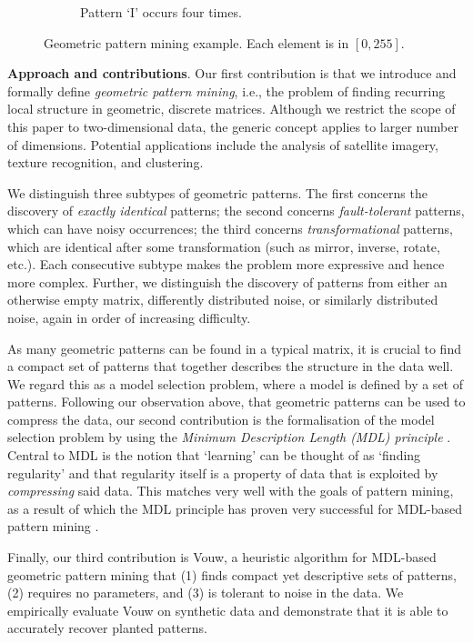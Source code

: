 \documentclass{llncs}
\begin{document}
\begin{figure}[t]
\begin{subfigure}[t]{0.37\textwidth}
\caption{Pattern `I' occurs four times.}
\label{fig-example1c}
\end{subfigure}%
\caption{Geometric pattern mining example. Each element is in $[0,255]$.}
\label{fig-example1}
\end{figure}  

\smallskip
\noindent \textbf{Approach and contributions}. Our first contribution is that we introduce and formally define \emph{geometric pattern mining}, i.e., the problem of finding recurring local structure in geometric, discrete matrices. Although we restrict the scope of this paper to two-dimensional data, the generic concept applies to larger number of dimensions. Potential applications include the analysis of satellite imagery, texture recognition, and clustering.

We distinguish three subtypes of geometric patterns. The first concerns the discovery of \emph{exactly identical} patterns; the second concerns \emph{fault-tolerant} patterns, which can have noisy occurrences; the third concerns \emph{transformational} patterns, which are identical after some transformation (such as mirror, inverse, rotate, etc.). Each consecutive subtype makes the problem more expressive and hence more complex. Further, we distinguish the discovery of patterns from either an otherwise empty matrix, differently distributed noise, or similarly distributed noise, again in order of increasing difficulty.

As many geometric patterns can be found in a typical matrix, it is crucial to find a compact set of patterns that together describes the structure in the data well. We regard this as a model selection problem, where a model is defined by a set of patterns. Following our observation above, that geometric patterns can be used to compress the data, our second contribution is the formalisation of the model selection problem by using the \emph{Minimum Description Length (MDL) principle} \cite{rissanenmdl,grunwaldmdl}. Central to MDL is the notion that `learning' can be thought of as `finding regularity' and that regularity itself is a property of data that is exploited by \emph{compressing} said data. This matches very well with the goals of pattern mining, as a result of which the MDL principle has proven very successful for MDL-based pattern mining \cite{krimp,classy}.

Finally, our third contribution is Vouw, a heuristic algorithm for MDL-based geometric pattern mining that (1) finds compact yet descriptive sets of patterns, (2) requires no parameters, and (3) is tolerant to noise in the data. We empirically evaluate Vouw on synthetic data and demonstrate that it is able to accurately recover planted patterns.
\end{document}
